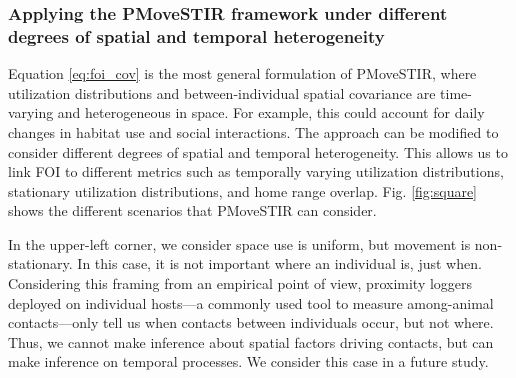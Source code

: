 \documentclass[letterpaper]{article}
\begin{document}

\subsubsection*{Applying the PMoveSTIR framework under different degrees of spatial and temporal heterogeneity}

Equation \ref{eq:foi_cov} is the most general formulation of PMoveSTIR, where utilization distributions and between-individual spatial covariance are time-varying and heterogeneous in space. For example, this could account for daily changes in habitat use and social interactions. The approach can be modified to consider different degrees of spatial and temporal heterogeneity. This allows us to link FOI to different metrics such as temporally varying utilization distributions, stationary utilization distributions, and home range overlap. Fig. \ref{fig:square} shows the different scenarios that PMoveSTIR can consider. 

In the upper-left corner, we consider space use is uniform, but movement is non-stationary. In this case, it is not important where an individual is, just when. Considering this framing from an empirical point of view, proximity loggers deployed on individual hosts---a commonly used tool to measure among-animal contacts---only tell us when contacts between individuals occur, but not where.  Thus, we cannot make inference about spatial factors driving contacts, but can make inference on temporal processes.  We consider this case in a future study.
\end{document}
